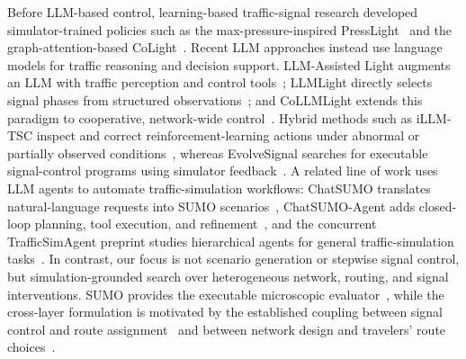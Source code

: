 Before LLM-based control, learning-based traffic-signal research developed
simulator-trained policies such as the max-pressure-inspired
PressLight~\cite{wei2019presslight} and the graph-attention-based
CoLight~\cite{wei2019colight}. Recent LLM approaches instead use language models for
traffic reasoning and decision support. LLM-Assisted Light augments an LLM with
traffic perception and control tools~\cite{wang2024llmassistedlight}; LLMLight
directly selects signal phases from structured
observations~\cite{lai2025llmlight}; and CoLLMLight extends this paradigm to cooperative,
network-wide control~\cite{yuan2026collmlight}. Hybrid methods such as iLLM-TSC
inspect and correct reinforcement-learning actions under abnormal or partially
observed conditions~\cite{pang2024illmtsc}, whereas EvolveSignal searches for
executable signal-control programs using simulator
feedback~\cite{wang2025evolvesignal}. A related line of work uses LLM agents to automate
traffic-simulation workflows: ChatSUMO translates natural-language requests
into SUMO scenarios~\cite{li2024chatsumo}, ChatSUMO-Agent adds closed-loop
planning, tool execution, and refinement~\cite{li2026chatsumoagent}, and the
concurrent TrafficSimAgent preprint studies hierarchical agents for general
traffic-simulation tasks~\cite{du2025trafficsimagent}. In contrast, our focus is
not scenario generation or stepwise signal control, but simulation-grounded
search over heterogeneous network, routing, and signal interventions. SUMO
provides the executable microscopic evaluator~\cite{lopez2018sumo}, while the
cross-layer formulation is motivated by the established coupling between
signal control and route assignment~\cite{meneguzzer1997combined} and between
network design and travelers' route choices~\cite{yang1998networkdesign}.
